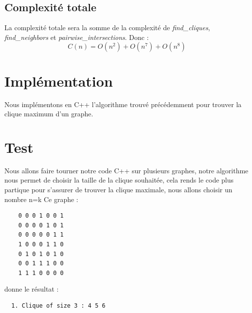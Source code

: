 \documentclass{article}
\begin{document}
\subsection{Complexité totale}
La complexité totale sera la somme de la complexité de \textit{find\_cliques}, \textit{find\_neighbors}
et \textit{pairwise\_intersections}. Donc :
\begin{displaymath}
C(n)=O(n^2)+O(n^7)+O(n^8)
\end{displaymath}

\section{Implémentation}
Nous implémentons en C++ l'algorithme trouvé précédemment pour trouver la clique
maximum d'un graphe.

\section{Test}
Nous allons faire tourner notre code C++ sur plusieurs graphes, notre algorithme
nous permet de choisir la taille de la clique souhaitée, cela rends le code plus partique
pour s'assurer de trouver la clique maximale, nous allons choisir un nombre n=k
Ce graphe :
\begin{center}
  \begin{verbatim}
    0 0 0 1 0 0 1
    0 0 0 0 1 0 1
    0 0 0 0 0 1 1
    1 0 0 0 1 1 0
    0 1 0 1 0 1 0
    0 0 1 1 1 0 0
    1 1 1 0 0 0 0
  \end{verbatim}
\end{center}
donne le résultat :
\begin{center}
  \begin{verbatim}
  1. Clique of size 3 : 4 5 6
  \end{verbatim}
\end{center}
\end{document}

